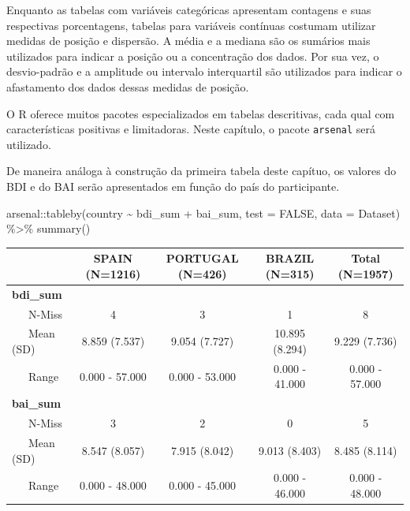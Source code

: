 \documentclass[
]{book}
\newenvironment{Shaded}{\begin{snugshade}}{\end{snugshade}}
\newcommand{\AttributeTok}[1]{\textcolor[rgb]{0.77,0.63,0.00}{#1}}
\newcommand{\ConstantTok}[1]{\textcolor[rgb]{0.00,0.00,0.00}{#1}}
\newcommand{\FunctionTok}[1]{\textcolor[rgb]{0.00,0.00,0.00}{#1}}
\newcommand{\NormalTok}[1]{#1}
\newcommand{\SpecialCharTok}[1]{\textcolor[rgb]{0.00,0.00,0.00}{#1}}
\begin{document}
Enquanto as tabelas com variáveis categóricas apresentam contagens e suas respectivas porcentagens, tabelas para variáveis contínuas costumam utilizar medidas de posição e dispersão. A média e a mediana são os sumários mais utilizados para indicar a posição ou a concentração dos dados. Por sua vez, o desvio-padrão e a amplitude ou intervalo interquartil são utilizados para indicar o afastamento dos dados dessas medidas de posição.

O R oferece muitos pacotes especializados em tabelas descritivas, cada qual com características positivas e limitadoras. Neste capítulo, o pacote \texttt{arsenal} será utilizado.

De maneira análoga à construção da primeira tabela deste capítuo, os valores do BDI e do BAI serão apresentados em função do país do participante.

\begin{Shaded}
\begin{Highlighting}[]
\NormalTok{arsenal}\SpecialCharTok{::}\FunctionTok{tableby}\NormalTok{(country }\SpecialCharTok{\textasciitilde{}}\NormalTok{ bdi\_sum }\SpecialCharTok{+}\NormalTok{ bai\_sum, }
                 \AttributeTok{test =} \ConstantTok{FALSE}\NormalTok{, }\AttributeTok{data =}\NormalTok{ Dataset) }\SpecialCharTok{\%\textgreater{}\%} 
  \FunctionTok{summary}\NormalTok{()}
\end{Highlighting}
\end{Shaded}

\begin{longtable}[]{@{}lcccc@{}}
\toprule
& SPAIN (N=1216) & PORTUGAL (N=426) & BRAZIL (N=315) & Total (N=1957) \\
\midrule
\endhead
\textbf{bdi\_sum} & & & & \\
~~~N-Miss & 4 & 3 & 1 & 8 \\
~~~Mean (SD) & 8.859 (7.537) & 9.054 (7.727) & 10.895 (8.294) & 9.229 (7.736) \\
~~~Range & 0.000 - 57.000 & 0.000 - 53.000 & 0.000 - 41.000 & 0.000 - 57.000 \\
\textbf{bai\_sum} & & & & \\
~~~N-Miss & 3 & 2 & 0 & 5 \\
~~~Mean (SD) & 8.547 (8.057) & 7.915 (8.042) & 9.013 (8.403) & 8.485 (8.114) \\
~~~Range & 0.000 - 48.000 & 0.000 - 45.000 & 0.000 - 46.000 & 0.000 - 48.000 \\
\bottomrule
\end{longtable}
\end{document}
